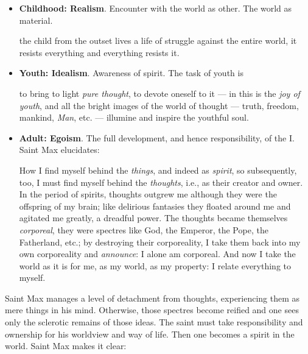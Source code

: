 \begin{itemize}


\item \textbf{Childhood: Realism}. Encounter with the world as other. The world as material.

\begin{quotex}
the child from the outset lives a life of struggle against the entire world, it resists everything and everything resists it.
\end{quotex}


\item \textbf{Youth: Idealism}. Awareness of spirit. The task of youth is

\begin{quotex}
to bring to light \emph{pure thought}, to devote oneself to it --- in this is the \emph{joy of youth}, and all the bright images of the world of thought --- truth, freedom, mankind, \emph{Man}, etc. --- illumine and inspire the youthful soul.
\end{quotex}


\item \textbf{Adult: Egoism}. The full development, and hence responsibility, of the I. Saint Max elucidates:

\begin{quotex}
How I find myself behind the \emph{things}, and indeed as \emph{spirit}, so subsequently, too, I must find myself behind the \emph{thoughts}, i.e., as their creator and owner. In the period of spirits, thoughts outgrew me although they were the offspring of my brain; like delirious fantasies they floated around me and agitated me greatly, a dreadful power. The thoughts became themselves \emph{corporeal}, they were spectres like God, the Emperor, the Pope, the Fatherland, etc.; by destroying their corporeality, I take them back into my own corporeality and \emph{announce}: I alone am corporeal. And now I take the world as it is for me, as my world, as my property: I relate everything to myself.
\end{quotex}

\end{itemize}


Saint Max manages a level of detachment from thoughts, experiencing them as mere things in his mind. Otherwise, those spectres become reified and one sees only the sclerotic remains of those ideas. The saint must take responsibility and ownership for his worldview and way of life. Then one becomes a spirit in the world. Saint Max makes it clear:

